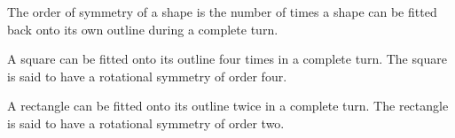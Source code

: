 The order of symmetry of a shape is the number of times a shape can be fitted back 
onto its own outline during a complete turn.
\par
A square can be fitted onto its outline four times in a complete turn. 
The square is said to have a rotational symmetry of order four.

\par
A rectangle can be fitted onto its outline twice in a complete turn.  
The rectangle is said to have a rotational symmetry of order two.